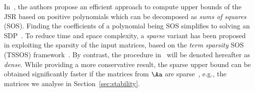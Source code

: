 In~\cite{parrilo}, the authors propose an efficient approach to compute upper bounds of the JSR based on positive polynomials which can be decomposed as \emph{sums of squares} (SOS). 
Finding the coefficients of a polynomial being SOS simplifies to solving an SDP~\cite{lasserre2001global}.
%
To reduce time and space complexity, a \emph{sparse} variant has been proposed in \cite{sparsejsr} exploiting the sparsity of the input matrices, based on the \emph{term sparsity} SOS (TSSOS) framework~\cite{tssos}.
By contrast, the procedure in~\cite{parrilo} will be denoted hereafter as \emph{dense}.
While providing a more conservative result, the sparse upper bound can be obtained significantly faster if the matrices from $\Aa$ are sparse~\cite{sparsejsr}, e.g., the matrices we analyse in Section~\ref{sec:stability}.
